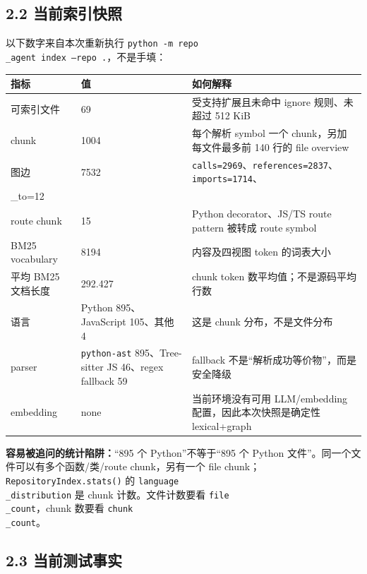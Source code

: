 \documentclass[UTF8,12pt,openany]{ctexbook}
\begin{document}
\subsection{2.2 当前索引快照}

以下数字来自本次重新执行 \texttt{python -m repo\\_agent index --repo .}，不是手填：\par

\begin{center}
\small
\begin{longtable}{|p{}|p{}|p{}|}
\toprule
指标 & 值 & 如何解释 \\
\midrule
可索引文件 & 69 & 受支持扩展且未命中 ignore 规则、未超过 512 KiB \\
chunk & 1004 & 每个解析 symbol 一个 chunk，另加每文件最多前 140 行的 file overview \\
图边 & 7532 & \texttt{calls=2969}、\texttt{references=2837}、\texttt{imports=1714}、\texttt{routes\\_to=12} \\
route chunk & 15 & Python decorator、JS/TS route pattern 被转成 route symbol \\
BM25 vocabulary & 8194 & 内容及四视图 token 的词表大小 \\
平均 BM25 文档长度 & 292.427 & chunk token 数平均值；不是源码平均行数 \\
语言 & Python 895、JavaScript 105、其他 4 & 这是 chunk 分布，不是文件分布 \\
parser & \texttt{python-ast} 895、Tree-sitter JS 46、regex fallback 59 & fallback 不是“解析成功等价物”，而是安全降级 \\
embedding & none & 当前环境没有可用 LLM/embedding 配置，因此本次快照是确定性 lexical+graph \\
\bottomrule
\end{longtable}
\end{center}

\textbf{容易被追问的统计陷阱：}“895 个 Python”不等于“895 个 Python 文件”。同一个文件可以有多个函数/类/route chunk，另有一个 file chunk；\texttt{RepositoryIndex.stats()} 的 \texttt{language\\_distribution} 是 chunk 计数。文件计数要看 \texttt{file\\_count}，chunk 数要看 \texttt{chunk\\_count}。\par

\subsection{2.3 当前测试事实}
\end{document}
